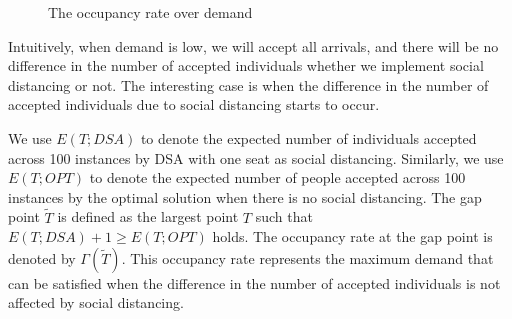 \begin{figure}[h]
  \centering
  \caption{The occupancy rate over demand}
  \label{Fig.lable}
\end{figure}

Intuitively, when demand is low, we will accept all arrivals, and there will be no difference in the number of accepted individuals whether we implement social distancing or not. The interesting case is when the difference in the number of accepted individuals due to social distancing starts to occur.

We use $E(T; DSA)$ to denote the expected number of individuals accepted across 100 instances by DSA with one seat as social distancing. Similarly, we use $E(T; OPT)$ to denote the expected number of people accepted across 100 instances by the optimal solution when there is no social distancing. The gap point $\tilde{T}$ is defined as the largest point $T$ such that $E(T; DSA)+1 \geq E(T; OPT)$ holds. The occupancy rate at the gap point is denoted by $\Gamma(\tilde{T})$. This occupancy rate represents the maximum demand that can be satisfied when the difference in the number of accepted individuals is not affected by social distancing.


